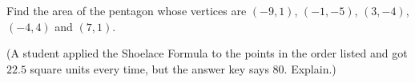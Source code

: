 Find the area of the pentagon whose vertices are $(-9,1)$, $(-1,-5)$, $(3,-4)$, $(-4,4)$ and $(7,1)$.

(A student applied the Shoelace Formula to the points in the order listed and got $22.5$ square units every time, but the answer key says $80$. Explain.)

